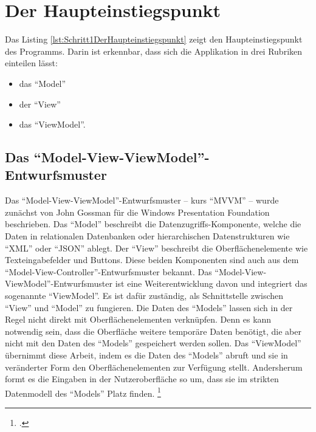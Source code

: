 \ifodd\value{page}\hbox{}\newpage\fi

\section{Der Haupteinstiegspunkt}
\label{sec:Haupteinstiegspunkt}

Das Listing \ref{lst:Schritt1DerHaupteinstiegspunkt} zeigt den Haupteinstiegspunkt des Programms.
Darin ist erkennbar, dass sich die Applikation in drei Rubriken einteilen lässt:
\begin{itemize}
  \item das \enquote{Model} 
  \item der \enquote{View} 
  \item das \enquote{ViewModel}. 
\end{itemize}



\subsection{Das \enquote{Model-View-ViewModel}-Entwurfsmuster}
\label{sec:ModelViewViewModel}
Das \enquote{Model-View-ViewModel}-Entwurfsmuster -- kurs \enquote{MVVM} -- wurde zunächst von John Gossman für die Windows Presentation Foundation beschrieben.
Das \enquote{Model} beschreibt die Datenzugriffs-Komponente, welche die Daten in relationalen Datenbanken oder hierarchischen Datenstrukturen wie \enquote{XML} oder \enquote{JSON} ablegt.
Der \enquote{View} beschreibt die Oberflächenelemente wie Texteingabefelder und Buttons.
Diese beiden Komponenten sind auch aus dem \enquote{Model-View-Controller}-Entwurfsmuster bekannt.
Das \enquote{Model-View-ViewModel}-Entwurfsmuster ist eine Weiterentwicklung davon und integriert das sogenannte \enquote{ViewModel}.
Es ist dafür zuständig, als Schnittstelle zwischen \enquote{View} und \enquote{Model} zu fungieren.
Die Daten des \enquote{Models} lassen sich in der Regel nicht direkt mit Oberflächenelementen verknüpfen.
Denn es kann notwendig sein, dass die Oberfläche weitere temporäre Daten benötigt, die aber nicht mit den Daten des \enquote{Models} gespeichert werden sollen.
Das \enquote{ViewModel} übernimmt diese Arbeit, indem es die Daten des \enquote{Models} abruft und sie in veränderter Form den Oberflächenelementen zur Verfügung stellt.
Andersherum formt es die Eingaben in der Nutzeroberfläche so um, dass sie im strikten Datenmodell des \enquote{Models} Platz finden.
\footcite[Vgl.][]{IntroductionToModelViewViewModelPatternForBuildingWPFApps}

